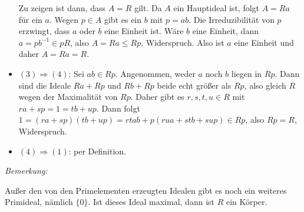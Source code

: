 \begin{mysatz}
\begin{itemize}
            Zu zeigen ist dann, dass $A = R$ gilt. Da $A$ ein Hauptideal ist, folgt $A = Ra$ für ein $a$. Wegen $p \in A$ gibt es ein $b$ mit $p = ab$.
            Die Irreduzibilität von $p$ erzwingt, dass $a$ oder $b$ eine Einheit ist. Wäre $b$ eine Einheit, dann $a = pb^{-1} \in pR$, also $A = Ra \leq Rp$, Widerspruch.
            Also ist $a$ eine Einheit und daher $A = Ra = R$.
        \item $(3)\Rightarrow(4)$: Sei $ab \in Rp$. Angenommen, weder $a$ noch $b$ liegen in $Rp$.
            Dann sind die Ideale $Ra + Rp$ und $Rb + Rp$ beide echt größer als $Rp$, also gleich $R$ wegen der Maximalität von $Rp$.
            Daher gibt es $r,s,t,u \in R$ mit $ra+sp = 1 = tb+up$. Dann folgt $1 = (ra + sp)(tb + up) = rtab + p(rua + stb + sup)\in Rp$, also $Rp = R$, Widerspruch.
        \item $(4)\Rightarrow(1)$: per Definition.
    \end{itemize}
\end{mysatz}


\textit{Bemerkung:}

Außer den von den Primelementen erzeugten Idealen gibt es noch ein weiteres Primideal, nämlich $\{0\}$. Ist dieses Ideal maximal, dann ist $R$ ein Körper.


